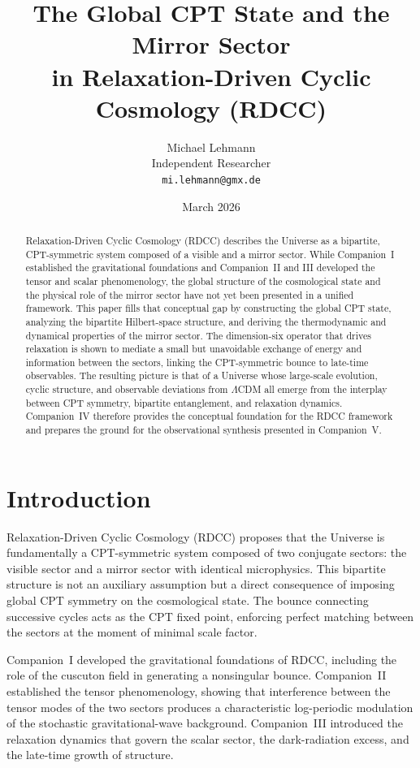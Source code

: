\documentclass[11pt,a4paper]{article}
\title{\textbf{The Global CPT State and the Mirror Sector\\
in Relaxation-Driven Cyclic Cosmology (RDCC)}}
\author{Michael Lehmann \\
        Independent Researcher \\
        \texttt{mi.lehmann@gmx.de}}
\date{March 2026}
\begin{document}
\maketitle

\begin{abstract}
Relaxation-Driven Cyclic Cosmology (RDCC) describes the Universe as a bipartite, CPT-symmetric system composed of a visible and a mirror sector. While Companion~I established the gravitational foundations and Companion~II and III developed the tensor and scalar phenomenology, the global structure of the cosmological state and the physical role of the mirror sector have not yet been presented in a unified framework. This paper fills that conceptual gap by constructing the global CPT state, analyzing the bipartite Hilbert-space structure, and deriving the thermodynamic and dynamical properties of the mirror sector. The dimension-six operator that drives relaxation is shown to mediate a small but unavoidable exchange of energy and information between the sectors, linking the CPT-symmetric bounce to late-time observables. The resulting picture is that of a Universe whose large-scale evolution, cyclic structure, and observable deviations from $\Lambda$CDM all emerge from the interplay between CPT symmetry, bipartite entanglement, and relaxation dynamics. Companion~IV therefore provides the conceptual foundation for the RDCC framework and prepares the ground for the observational synthesis presented in Companion~V.
\end{abstract}

\tableofcontents
\newpage

\section{Introduction}

Relaxation-Driven Cyclic Cosmology (RDCC) proposes that the Universe is fundamentally a CPT-symmetric system composed of two conjugate sectors: the visible sector and a mirror sector with identical microphysics. This bipartite structure is not an auxiliary assumption but a direct consequence of imposing global CPT symmetry on the cosmological state. The bounce connecting successive cycles acts as the CPT fixed point, enforcing perfect matching between the sectors at the moment of minimal scale factor.

Companion~I developed the gravitational foundations of RDCC, including the role of the cuscuton field in generating a nonsingular bounce. Companion~II established the tensor phenomenology, showing that interference between the tensor modes of the two sectors produces a characteristic log-periodic modulation of the stochastic gravitational-wave background. Companion~III introduced the relaxation dynamics that govern the scalar sector, the dark-radiation excess, and the late-time growth of structure.
\end{document}

